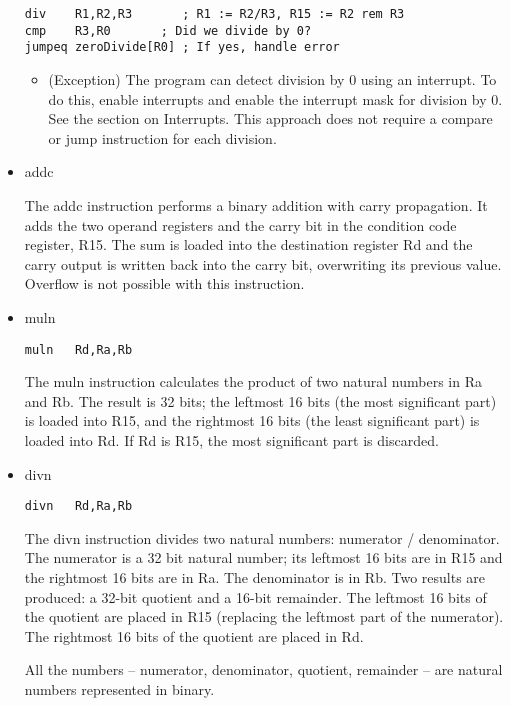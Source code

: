 \documentclass[11pt]{article}
\begin{document}
\begin{itemize}
\begin{verbatim}
div    R1,R2,R3       ; R1 := R2/R3, R15 := R2 rem R3
cmp    R3,R0       ; Did we divide by 0?
jumpeq zeroDivide[R0] ; If yes, handle error
\end{verbatim}

\begin{itemize}
\item (Exception) The program can detect division by 0 using an interrupt.
To do this, enable interrupts and enable the interrupt mask for
division by 0.  See the section on Interrupts.  This approach does
not require a compare or jump instruction for each division.
\end{itemize}

\item addc
\label{sec:org4e0c045}

The addc instruction performs a binary addition with carry
propagation.  It adds the two operand registers and the carry bit in
the condition code register, R15.  The sum is loaded into the
destination register Rd and the carry output is written back into the
carry bit, overwriting its previous value.  Overflow is not possible
with this instruction.

\item muln
\label{sec:orga013620}

\begin{verbatim}
muln   Rd,Ra,Rb
\end{verbatim}

The muln instruction calculates the product of two natural numbers in
Ra and Rb.  The result is 32 bits; the leftmost 16 bits (the most
significant part) is loaded into R15, and the rightmost 16 bits (the
least significant part) is loaded into Rd.  If Rd is R15, the most
significant part is discarded.

\item divn
\label{sec:org27a28dd}

\begin{verbatim}
divn   Rd,Ra,Rb
\end{verbatim}

The divn instruction divides two natural numbers: numerator /
denominator.  The numerator is a 32 bit natural number; its leftmost
16 bits are in R15 and the rightmost 16 bits are in Ra.  The
denominator is in Rb.  Two results are produced: a 32-bit quotient and
a 16-bit remainder.  The leftmost 16 bits of the quotient are placed
in R15 (replacing the leftmost part of the numerator).  The rightmost
16 bits of the quotient are placed in Rd.

All the numbers -- numerator, denominator, quotient, remainder -- are
natural numbers represented in binary.
\end{itemize}
\end{document}
